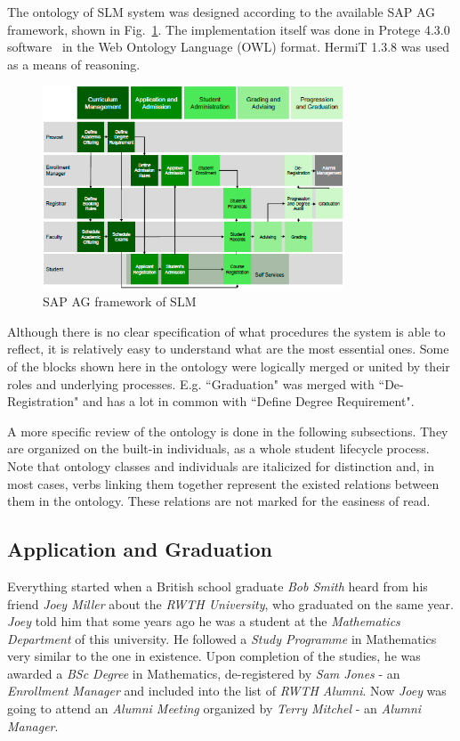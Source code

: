 \documentclass{article}    %
\begin{document}
The ontology of SLM system was designed according to the available SAP AG framework, shown in Fig.~\ref{SAP}. The implementation itself was done in Protege 4.3.0 software~\cite{pro} in the Web Ontology Language (OWL) format. HermiT 1.3.8 was used as a means of reasoning. 
\begin{figure}[htbp]
  \centering
    \includegraphics[width=0.8\textwidth]{Materials/Figures/1.png}
    \caption{SAP AG framework of SLM~\cite{sap}}
  \label{SAP}
\end{figure}

Although there is no clear specification of what procedures the system is able to reflect, it is relatively easy to understand what are the most essential ones. Some of the blocks shown here in the ontology were logically merged or united by their roles and underlying processes. E.g. ``Graduation" was merged with ``De-Registration" and has a lot in common with ``Define Degree Requirement". 

A more specific review of the ontology is done in the following subsections. They are organized on the built-in individuals, as a whole student lifecycle process. Note that ontology classes and individuals are italicized for distinction and, in most cases, verbs linking them together represent the existed relations between them in the ontology. These relations are not marked for the easiness of read.
%
\subsection{Application and Graduation}
%
Everything started when a British school graduate \textit{Bob Smith} heard from his friend \textit{Joey Miller} about the \textit{RWTH University}, who graduated on the same year. \textit{Joey} told him that some years ago he was a student at the \textit{Mathematics Department} of this university. He followed a \textit{Study Programme} in Mathematics very similar to the one in existence. Upon completion of the studies, he was awarded a \textit{BSc Degree} in Mathematics, de-registered by \textit{Sam Jones} - an \textit{Enrollment Manager} and included into the list of \textit{RWTH Alumni}. Now \textit{Joey} was going to attend an \textit{Alumni Meeting} organized by \textit{Terry Mitchel} - an \textit{Alumni Manager}.
\end{document}
